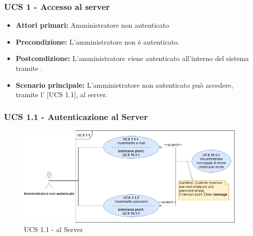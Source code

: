 \subsubsection{UCS 1 - Accesso al server}%

\begin{itemize}
\item \textbf{Attori primari:} Amministratore non autenticato
\item \textbf{Precondizione:} L'amministratore non è autenticato.
\item \textbf{Postcondizione:} L'amministratore viene autenticato all'interno del sistema tramite .
\item \textbf{Scenario principale:} L'amministratore non autenticato può accedere, tramite l' [UCS 1.1], al server. 
\end{itemize}

\subsubsection{UCS 1.1 - Autenticazione al Server}

\begin{figure}[h]
    \centering
    \includegraphics[scale=0.6]{Sezioni/UseCase/Immagini/UCS1.1.png}
    \caption{UCS 1.1 -  al Server}
\end{figure}

